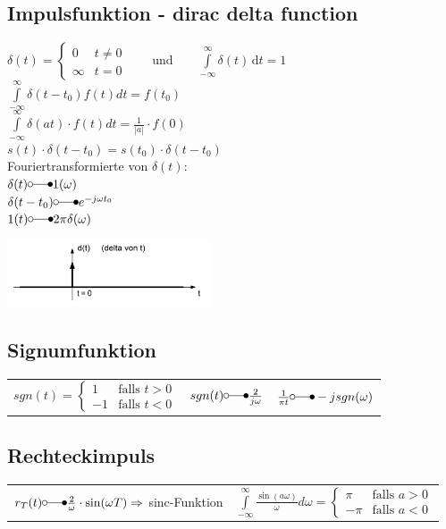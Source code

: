 \subsection{Impulsfunktion - dirac delta function}
	\begin{minipage}{10cm}
		$\delta (t)=\begin{cases} 0 & t\ne 0\\\infty & t=0\end{cases} \qquad
		\text{und} \qquad \int\limits_{-\infty}^\infty \delta(t) \, \mathrm dt = 1 $\\
		$\int\limits_{-\infty}^{\infty}\delta(t-t_0)f(t)dt=f(t_0)$\\
		$\int\limits_{-\infty}^{\infty}\delta(at)\cdot f(t) dt = \frac{1}{|a|} \cdot f(0)$\\
		$s(t) \cdot \delta(t-t_0) = s(t_0)\cdot \delta(t-t_0)$\\
		Fouriertransformierte von $\delta(t)$:\\
		$\delta(t) \laplace 1(\omega)$\\
		$\delta(t-t_0) \laplace e^{-j\omega t_0}$\\
		$1(t) \laplace 2\pi \delta(\omega)$
	\end{minipage}
	\begin{minipage}{8cm}
		\includegraphics[width=6cm]{./bilder/diracimpulse.png}
	\end{minipage}
	
\subsection{Signumfunktion}
	\begin{tabular}{p{6cm} p{6cm} p{6cm}}
		$sgn(t) = \begin{cases} 1 & \text{falls }t > 0 \\ -1 & \text{falls }t < 0 \end{cases}$ &
		$sgn(t) \laplace \frac{2}{j\omega}$ &
		$\frac{1}{\pi t} \laplace -j sgn(\omega)$
	\end{tabular}
	
\subsection{Rechteckimpuls}
	\begin{tabular}{p{9cm} p{9cm}}
		$r_T(t) \laplace \frac{2}{\omega} \cdot \sin(\omega T) \Rightarrow$ sinc-Funktion &
		$\int\limits_{-\infty}^{\infty} \frac{\sin(a \omega)}{\omega} d\omega = 
		\begin{cases} \pi & \text{falls }a > 0 \\ -\pi & \text{falls }a < 0 \end{cases}$
	\end{tabular}
